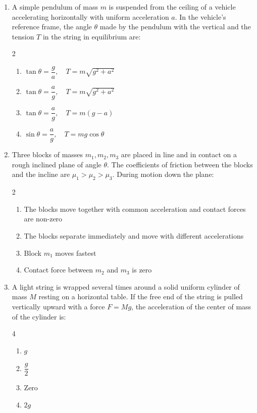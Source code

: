 \documentclass[11pt,a4paper]{article}
\begin{document}
\begin{enumerate}[label=\textbf{\arabic*.},leftmargin=18pt,itemsep=8pt,resume]
  \item A simple pendulum of mass $m$ is suspended from the ceiling of a vehicle accelerating horizontally with uniform acceleration $a$. In the vehicle's reference frame, the angle $\theta$ made by the pendulum with the vertical and the tension $T$ in the string in equilibrium are:
  \begin{multicols}{2}
    \begin{enumerate}[label=(\Alph*)]
      \item $\tan\theta = \dfrac{g}{a}, \quad T = m\sqrt{g^2 + a^2}$
      \item $\tan\theta = \dfrac{a}{g}, \quad T = m\sqrt{g^2 + a^2}$
      \item $\tan\theta = \dfrac{a}{g}, \quad T = m(g - a)$
      \item $\sin\theta = \dfrac{a}{g}, \quad T = mg\cos\theta$
    \end{enumerate}
  \end{multicols}

  \item Three blocks of masses $m_1, m_2, m_3$ are placed in line and in contact on a rough inclined plane of angle $\theta$. The coefficients of friction between the blocks and the incline are $\mu_1 > \mu_2 > \mu_3$. During motion down the plane:
  \begin{multicols}{2}
    \begin{enumerate}[label=(\Alph*)]
      \item The blocks move together with common acceleration and contact forces are non-zero
      \item The blocks separate immediately and move with different accelerations
      \item Block $m_1$ moves fastest
      \item Contact force between $m_2$ and $m_3$ is zero
    \end{enumerate}
  \end{multicols}

  \item A light string is wrapped several times around a solid uniform cylinder of mass $M$ resting on a horizontal table. If the free end of the string is pulled vertically upward with a force $F = Mg$, the acceleration of the center of mass of the cylinder is:
  \begin{multicols}{4}
    \begin{enumerate}[label=(\Alph*)]
      \item $g$
      \item $\dfrac{g}{2}$
      \item $\text{Zero}$
      \item $2g$
    \end{enumerate}
  \end{multicols}


\end{enumerate}
\end{document}
